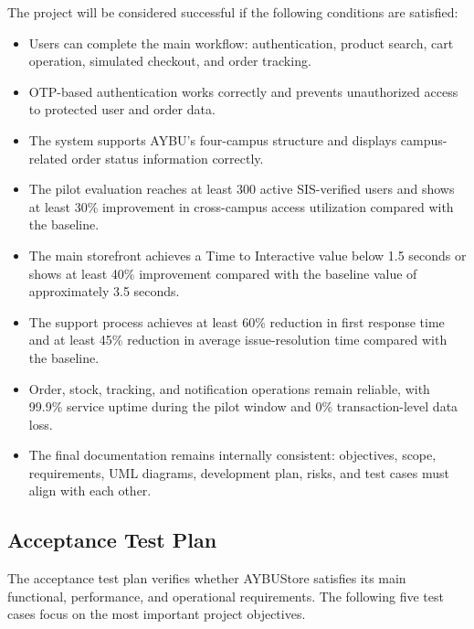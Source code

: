 \documentclass[11pt,a4paper]{article}
\begin{document}
The project will be considered successful if the following conditions
are satisfied:

\begin{itemize}[leftmargin=*]
    \item Users can complete the main workflow: authentication, product
    search, cart operation, simulated checkout, and order tracking.

    \item OTP-based authentication works correctly and prevents
    unauthorized access to protected user and order data.

    \item The system supports AYBU's four-campus structure and displays
    campus-related order status information correctly.

    \item The pilot evaluation reaches at least 300 active
    SIS-verified users and shows at least 30\% improvement in
    cross-campus access utilization compared with the baseline.

    \item The main storefront achieves a Time to Interactive value
    below 1.5 seconds or shows at least 40\% improvement compared with
    the baseline value of approximately 3.5 seconds.

    \item The support process achieves at least 60\% reduction in first
    response time and at least 45\% reduction in average issue-resolution
    time compared with the baseline.

    \item Order, stock, tracking, and notification operations remain
    reliable, with 99.9\% service uptime during the pilot window and
    0\% transaction-level data loss.

    \item The final documentation remains internally consistent:
    objectives, scope, requirements, UML diagrams, development plan,
    risks, and test cases must align with each other.
\end{itemize}

\subsection{Acceptance Test Plan}

The acceptance test plan verifies whether AYBUStore satisfies its main
functional, performance, and operational requirements. The following
five test cases focus on the most important project objectives.
\end{document}

